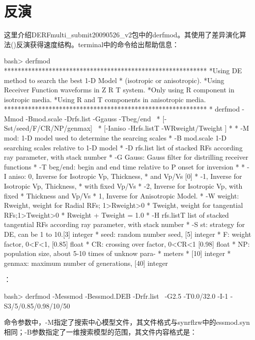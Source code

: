 \documentclass[a4paper]{article}
\begin{document}
\clearpage\section{反演}
这里介绍DERFmulti\_submit20090526\_v2包中的derfmod。其使用了差异演化算法()反演获得速度结构。terminal中的命令给出帮助信息：\par
\begin{bashCode}
bash> derfmod
***********************************************************
*Using DE method to search the best 1-D Model
*   (isotropic or anisotropic).
*Using Receiver Function waveforms in Z R T system.
*Only using R component in isotropic media.
*Using R and T components in anisotropic media.
***********************************************************
* derfmod  -Mmod -Bmod.scale -Drfs.list -Ggauss -Tbeg/end \
*	  [-Sst/seed/F/CR/NP/genmax] \
*         [-Ianiso -Hrfs.listT -WRweight/Tweight ]
*
* -M mod: 1-D model used to determine the searcing scales
* -B mod.scale 1-D searching scales relative to 1-D model
* -D rfs.list list of stacked RFs according ray parameter, 
       with stack number
* -G Gauss: Gauss filter for distrilling receiver functions
* -T beg/end: begin and end time relative to P onset for 
     inversion
*
* -I aniso: 0, Inverse for Isotropic Vp, Thickness, 
*              and Vp/Vs [0]
*	   -1, Inverse for Isotropic Vp, Thickness,
*              with fixed Vp/Vs
*	   -2, Inverse for Isotropic Vp, with fixed
*              Thickness and Vp/Vs
*	    1, Inverse for Anisotropic Model.
* -W weight: Rweight, weight for Radial RFs; 1>Rweight>0 
*	     Tweight, weight for tangential RFs;1>Tweight>0
*	     Rweight + Tweight = 1.0 
* -H rfs.listT list of stacked tangential RFs according ray 
               parameter, with stack number
* -S st: strategy for DE, can be 1 to 10.[3] integer
*    seed: random number seed,		 [5] integer
*    F: weight factor, 0<F<1,		 [0.85] float
*    CR: crossing over factor, 0<CR<1    [0.98] float
*    NP: population size, about 5-10 times of unknow para-
*        meters
*        [10] integer
*   genmax: maximum number of generations, [40] integer
\end{bashCode}
\par例子如下：\par
\begin{bashCode}
bash> derfmod -Messmod -Bessmod.DEB -Drfr.list \
      -G2.5 -T0.0/32.0 -I-1 -S3/5/0.85/0.98/10/50
\end{bashCode}
\par
命令参数中，-M指定了搜索中心模型文件，其文件格式与synrflzw中的essmod.syn相同；-B参数指定了一维搜索模型的范围，其文件内容格式是：\par
\end{document}
